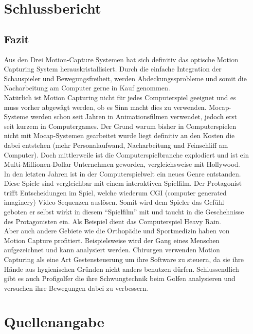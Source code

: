 \chapter{Schlussbericht}

\section{Fazit}
Aus den Drei Motion-Capture Systemen hat sich definitiv das optische Motion Capturing System herauskristallisiert. Durch die einfache Integration der Schauspieler und Bewegungsfreiheit, werden Abdeckungssprobleme und somit die Nacharbeitung am Computer gerne in Kauf genommen. \\
Natürlich ist Motion Capturing nicht für jedes Computerspiel geeignet und es muss vorher abgewägt werden, ob es Sinn macht dies zu verwenden. Mocap-Systeme werden schon seit Jahren in Animationsfilmen verwendet, jedoch erst seit kurzem in Computergames. Der Grund warum bisher in Computerspielen nicht mit Mocap-Systemen gearbeitet wurde liegt definitiv an den Kosten die dabei entstehen (mehr Personalaufwand, Nacharbeitung und Feinschliff am Computer). Doch mittlerweile ist die Computerspielbranche explodiert und ist ein Multi-Millionen-Dollar Unternehmen geworden, vergleichsweise mit Hollywood. \\
In den letzten Jahren ist in der Computerspielwelt ein neues Genre entstanden. Diese Spiele sind vergleichbar mit einem interaktiven Spielfilm. Der Protagonist trifft Entscheidungen im Spiel, welche wiederum CGI (computer generated imaginery) Video Sequenzen auslösen. Somit wird dem Spieler das Gefühl geboten er selbst wirkt in diesem ``Spielfilm'' mit und taucht in die Geschehnisse des Protagonisten ein. Als Beispiel dient das Computerspiel Heavy Rain.\\
Aber auch andere Gebiete wie die Orthopädie und Sportmedizin haben von Motion Capture profitiert. Beispielsweise wird der Gang eines Menschen aufgezeichnet und kann analysiert werden. Chirurgen verwenden Motion Capturing als eine Art Gestensteuerung um ihre Software zu steuern, da sie ihre Hände aus hygienischen Gründen nicht anders benutzen dürfen. Schlussendlich gibt es auch Profigolfer die ihre Schwungtechnik beim Golfen analysieren und versuchen ihre Bewegungen dabei zu verbessern.\\


\chapter{Quellenangabe}

